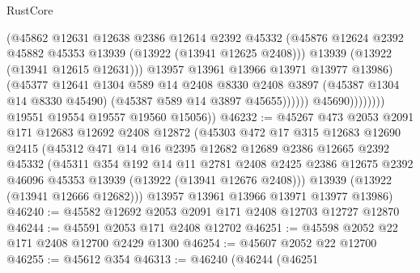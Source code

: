\begin{lexlean}{RustCore}
\begin{coremodule}
                                  (@45862
                                    @12631
                                    @12638
                                    @2386
                                    @12614
                                    @2392
                                    @45332
                                    (@45876
                                      @12624
                                      @2392
                                      @45882
                                      @45353
                                      @13939
                                      (@13922 (@13941 @12625 @2408)))
                                    @13939
                                    (@13922 (@13941 @12615 @12631)))
                                  @13957
                                  @13961
                                  @13966
                                  @13971
                                  @13977
                                  @13986)
                                (@45377
                                  @12641
                                  @1304
                                  @589
                                  @14
                                  @2408
                                  @8330
                                  @2408
                                  @3897
                                  (@45387 @1304 @14 @8330 @45490)
                                  (@45387 @589 @14 @3897 @45655))))))
                        @45690))))))))
        @19551
        @19554
        @19557
        @19560
        @15056))
@46232 := @45267
    @473
    @2053
    @2091
    @171
    @12683
    @12692
    @2408
    @12872
    (@45303
      @472
      @17
      @315
      @12683
      @12690
      @2415
      (@45312
        @471
        @14
        @16
        @2395
        @12682
        @12689
        @2386
        @12665
        @2392
        @45332
        (@45311
          @354
          @192
          @14
          @11
          @2781
          @2408
          @2425
          @2386
          @12675
          @2392
          @46096
          @45353
          @13939
          (@13922 (@13941 @12676 @2408)))
        @13939
        (@13922 (@13941 @12666 @12682)))
      @13957
      @13961
      @13966
      @13971
      @13977
      @13986)
@46240 := @45582 @12692 @2053 @2091 @171 @2408 @12703 @12727 @12870
@46244 := @45591 @2053 @171 @2408 @12702
@46251 := @45598 @2052 @22 @171 @2408 @12700 @2429 @1300
@46254 := @45607 @2052 @22 @12700
@46255 := @45612 @354
@46313 := @46240
    (@46244
      (@46251

\end{coremodule}
\end{lexlean}
